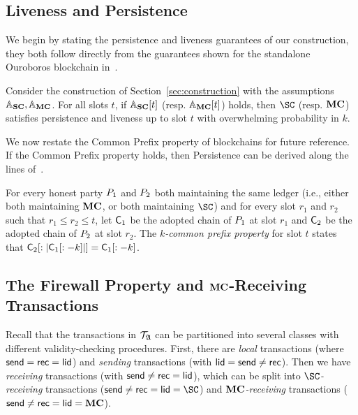 \subsection{Liveness and Persistence}

We begin by stating the persistence and liveness guarantees of our
construction, they both follow directly from the guarantees shown for the
standalone Ouroboros blockchain in~\cite{C:KRDO17}.

\begin{lemma}\label{lem:perslive}
  Consider the construction of Section~\ref{sec:construction} with
  the assumptions $\mathbb{A}_{\mathbf{SC}}, \mathbb{A}_{\mathbf{MC}}$. For all slots $t$, if
  $\mathbb{A}_{\mathbf{SC}}[t]$ (resp. $\mathbb{A}_{\mathbf{MC}}[t]$) holds, then $\SC$ (resp. $\mathbf{MC}$)
  satisfies persistence and liveness up to slot $t$ with overwhelming probability in $k$.
\end{lemma}

We now restate the Common Prefix property of blockchains for future reference.
If the Common Prefix property holds, then Persistence can be derived along the
lines of~\cite{C:KRDO17}.

\begin{definition}
  For every honest party $P_1$ and $P_2$
  both maintaining the same ledger (i.e., either both maintaining $\mathbf{MC}$, or both
  maintaining $\SC$) and for every slot $r_1$ and $r_2$ such that
  $r_1 \leq r_2 \leq t$, let $\mathsf{C}_1$ be the adopted chain of $P_1$ at
  slot $r_1$ and $\mathsf{C}_2$ be the adopted chain of $P_2$ at slot $r_2$.
  The \emph{$k$-common prefix property} for slot $t$ states
  that $\mathsf{C}_2[:|\mathsf{C}_1[:-k]|] = \mathsf{C}_1[:-k]$.
\end{definition}

\subsection{The Firewall Property and $\mathbf{MC}$-Receiving Transactions}

Recall that the transactions in $\mathcal{T}_{\mathfrak{A}}$ can be partitioned into several classes with
different validity-checking procedures. First, there are
\emph{local} transactions (where $\mathsf{send}=\mathsf{rec}=\mathsf{lid}$)
and
\emph{sending} transactions (with $\mathsf{lid}=\mathsf{send}\neq\mathsf{rec}$).
Then we have
\emph{receiving} transactions (with $\mathsf{send}\neq\mathsf{rec}=\mathsf{lid}$),
which can be split into
\emph{$\SC$-receiving} transactions ($\send\neq\rec=\llid=\SC$)
and
\emph{$\mathbf{MC}$-receiving} transactions ($\mathsf{send}\neq\mathsf{rec}=\mathsf{lid}=\mathbf{MC}$).

